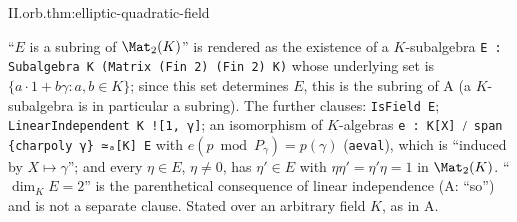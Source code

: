 \begin{theorem}
\end{theorem}
\begin{tfformal}{II.orb.thm:elliptic-quadratic-field}
\begin{tffidelity}
``$E$ is a subring of $\Mat_2(K)$'' is rendered as the existence of a $K$-subalgebra \texttt{E : Subalgebra K (Matrix (Fin 2) (Fin 2) K)} whose underlying set is $\{a\cdot1+b\gamma:a,b\in K\}$; since this set determines $E$, this is the subring of A (a $K$-subalgebra is in particular a subring). The further clauses: \texttt{IsField E}; \texttt{LinearIndependent K ![1, γ]}; an isomorphism of $K$-algebras \texttt{e : K[X] ⧸ span \{charpoly γ\} ≃ₐ[K] E} with $e(p\bmod P_\gamma)=p(\gamma)$ (\texttt{aeval}), which is ``induced by $X\mapsto\gamma$''; and every $\eta\in E$, $\eta\ne0$, has $\eta'\in E$ with $\eta\eta'=\eta'\eta=1$ in $\Mat_2(K)$. ``$\dim_KE=2$'' is the parenthetical consequence of linear independence (A: ``so'') and is not a separate clause. Stated over an arbitrary field $K$, as in A.
\end{tffidelity}
\end{tfformal}
